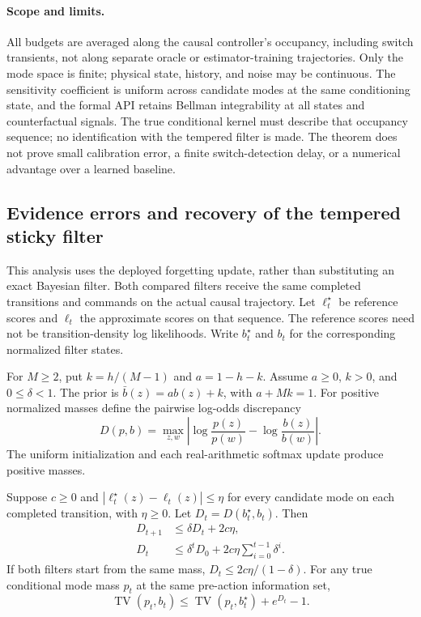 \paragraph{Scope and limits.}
All budgets are averaged along the causal controller's occupancy, including switch transients, not along separate oracle or estimator-training trajectories.
Only the mode space is finite; physical state, history, and noise may be continuous.
The sensitivity coefficient is uniform across candidate modes at the same conditioning state, and the formal API retains Bellman integrability at all states and counterfactual signals.
The true conditional kernel must describe that occupancy sequence; no identification with the tempered filter is made.
The theorem does not prove small calibration error, a finite switch-detection delay, or a numerical advantage over a learned baseline.

\subsection{Evidence errors and recovery of the tempered sticky filter}
\label{app:filter_stability}

This analysis uses the deployed forgetting update, rather than substituting an exact Bayesian filter.
Both compared filters receive the same completed transitions and commands on the actual causal trajectory.
Let $\ell_t^\star$ be reference scores and $\ell_t$ the approximate scores on that sequence.
The reference scores need not be transition-density log likelihoods.
Write $b_t^\star$ and $b_t$ for the corresponding normalized filter states.

For $M\ge2$, put $k=h/(M-1)$ and $a=1-h-k$.
Assume $a\ge0$, $k>0$, and $0\le\delta<1$.
The prior is $\bar b(z)=a b(z)+k$, with $a+Mk=1$.
For positive normalized masses define the pairwise log-odds discrepancy
\begin{equation}
 D(p,b)=\max_{z,w}\left|
 \log\frac{p(z)}{p(w)}-\log\frac{b(z)}{b(w)}\right|.
 \label{eq:filter_odds_discrepancy}
\end{equation}
The uniform initialization and each real-arithmetic softmax update produce positive masses.

\begin{theorem}
\label{thm:filter_stability}
Suppose $c\ge0$ and $|\ell_t^\star(z)-\ell_t(z)|\le\eta$ for every candidate mode on each completed transition, with $\eta\ge0$.
Let $D_t=D(b_t^\star,b_t)$. Then
\begin{align}
 D_{t+1}&\le\delta D_t+2c\eta,\\
 D_t&\le\delta^tD_0+2c\eta\sum_{i=0}^{t-1}\delta^i.
 \label{eq:filter_error_envelope}
\end{align}
If both filters start from the same mass, $D_t\le2c\eta/(1-\delta)$.
For any true conditional mode mass $p_t$ at the same pre-action information set,
\begin{equation}
 \operatorname{TV}(p_t,b_t)
 \le\operatorname{TV}(p_t,b_t^\star)+e^{D_t}-1.
 \label{eq:filter_reference_calibration}
\end{equation}
\end{theorem}

